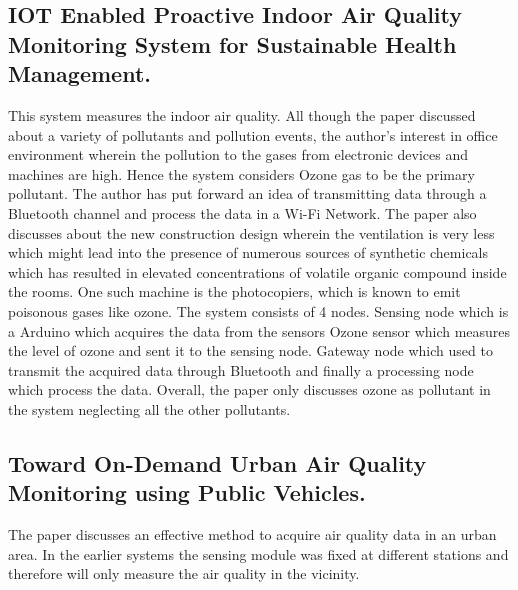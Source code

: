\documentclass[11pt]{article}
\begin{document}
\subsection{IOT Enabled Proactive Indoor Air Quality Monitoring System for Sustainable Health Management.}

This system measures the indoor air quality. All though the paper discussed about a variety of pollutants and pollution events, the author's interest in office environment wherein the pollution to the gases from electronic devices and machines are high. Hence the system considers Ozone gas to be the primary pollutant. The author has put forward an idea of transmitting data through a Bluetooth channel and process the data in a Wi-Fi Network. The paper also discusses about the new construction design wherein the ventilation is very less which might lead into the presence of numerous sources of synthetic chemicals which has resulted in elevated concentrations of volatile organic compound inside the rooms. One such machine is the photocopiers, which is known to emit poisonous gases like ozone. The system consists of 4 nodes.
Sensing node which is a Arduino which acquires the data from the sensors
Ozone sensor which measures the level of ozone and sent it to the sensing node. 
Gateway node which used to transmit the acquired data through Bluetooth and finally a processing node which process the data.
Overall, the paper only discusses ozone as pollutant in the system neglecting all the other pollutants.

\subsection{Toward On-Demand Urban Air Quality Monitoring using Public Vehicles.}

The paper discusses an effective method to acquire air quality data in an urban area. In the earlier systems the sensing module was fixed at different stations and therefore will only measure the air quality in the vicinity.
\end{document}
